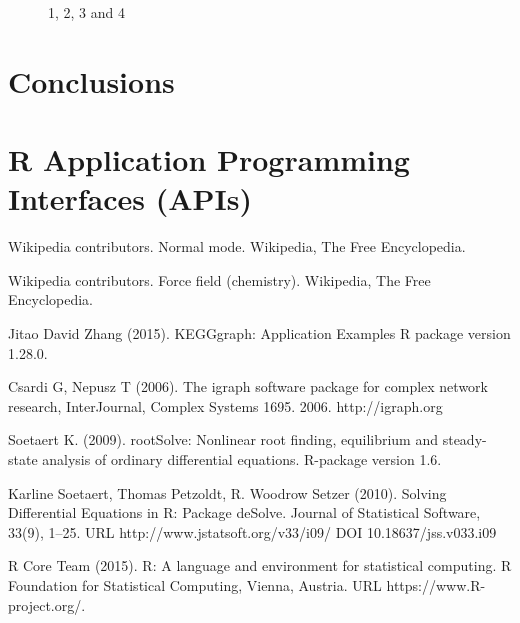 \begin{figure}[H]
	\centering
	\begin{minipage}[b]{0.5\linewidth}
	\end{minipage}\hfill
	\begin{minipage}[b]{0.5\linewidth}
	\end{minipage}\hfill	
	\begin{minipage}[b]{0.5\linewidth}
	\end{minipage}\hfill
	\begin{minipage}[b]{0.5\linewidth}
	\end{minipage}\hfill
	\caption{1, 2, 3 and 4}
	\label{fig:Figure1}
\end{figure} 


\section{Conclusions}


\section{R Application Programming Interfaces (APIs)}





\begin{thebibliography}{00}

Wikipedia contributors. 
\newblock Normal mode.
\newblock Wikipedia, The Free Encyclopedia.

Wikipedia contributors. 
\newblock Force field (chemistry).
\newblock Wikipedia, The Free Encyclopedia.

 Jitao David Zhang (2015). 
\newblock KEGGgraph: Application Examples
\newblock R package version 1.28.0.

Csardi G, Nepusz T (2006).
\newblock The igraph software package for complex network research,
\newblock  InterJournal, Complex Systems 1695. 2006. http://igraph.org

Soetaert K. (2009).  
\newblock rootSolve: Nonlinear root finding, equilibrium and steady-state analysis of ordinary differential equations.  
\newblock R-package version 1.6.

Karline Soetaert, Thomas Petzoldt, R. Woodrow Setzer (2010). 
\newblock Solving Differential Equations in R: Package deSolve. 
\newblock Journal of Statistical Software, 33(9), 1--25. URL http://www.jstatsoft.org/v33/i09/ DOI 10.18637/jss.v033.i09
 
R Core Team (2015). 
\newblock R: A language and environment for statistical computing. R Foundation for Statistical Computing, Vienna, Austria.
\newblock URL https://www.R-project.org/.

\end{thebibliography}

